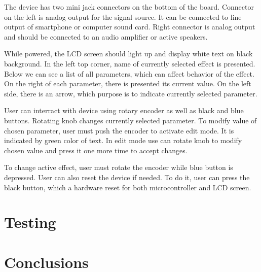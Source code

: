 \documentclass[a4paper,twoside,12pt]{book}
\newcounter{PagesWithoutNumbers}
\begin{document}
The device has two mini jack connectors on the bottom of the board.
Connector on the left is analog output for the signal source.
It can be connected to line output of smartphone or computer sound card.
Right connector is analog output and should be connected
to an audio amplifier or active speakers.

While powered, the LCD screen should light up
and display white text on black background.
In the left top corner, name of currently selected effect is presented.
Below we can see a list of all parameters,
which can affect behavior of the effect.
On the right of each parameter, there is presented its current value.
On the left side, there is an arrow,
which purpose is to indicate currently selected parameter.

User can interract with device using rotary encoder
as well as black and blue buttons.
Rotating knob changes currently selected parameter.
To modify value of chosen parameter, user must push the encoder
to activate edit mode. It is indicated by green color of text.
In edit mode use can rotate knob to modify chosen value
and press it one more time to accept changes.

To change active effect, user must rotate the encoder
while blue button is depressed. User can also reset the device if needed.
To do it, user can press the black button,
which a hardware reset for both microcontroller and LCD screen.



\chapter{Testing}



\chapter{Conclusions}


\backmatter
{}
\setcounter{page}{\value{PagesWithoutNumbers}}

\pagestyle{onlyPageNumbers}

\cite{ST:UM2407}
\printbibliography

\end{document}
